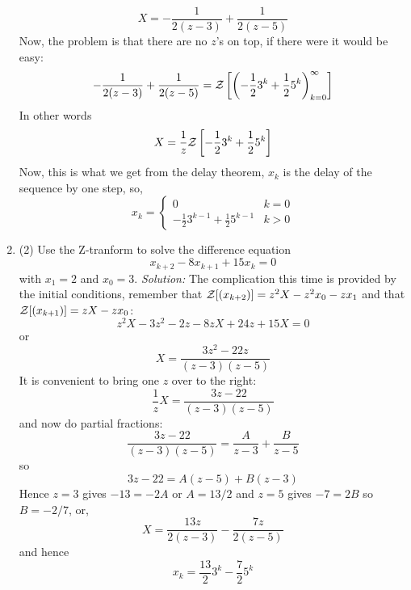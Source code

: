 \documentclass[12pt]{article}
\newcommand\soln{\noindent\textit{Solution:} }
\begin{document}
\begin{enumerate}
\begin{equation}
X=-\frac{1}{2(z-3)}+\frac{1}{2(z-5)}
\end{equation}
Now, the problem is that there are no $z$'s on top, if there were it would be easy:
\begin{equation}
-\frac{1}{2(z-3)}+\frac{1}{2(z-5)}={\cal Z}\left[\left(-\frac{1}{2}3^k+\frac{1}{2}5^k\right)_{k=0}^\infty\right]
\end{equation}
In other words
\begin{equation}
X=\frac{1}{z}{\cal Z}\left[-\frac{1}{2}3^k+\frac{1}{2}5^k\right]
\end{equation}
Now, this is what we get from the delay theorem, $x_k$ is the delay of the sequence by one step, so,
\begin{equation}
x_k=\left\{\begin{array}{ll}0&k=0\\-\frac{1}{2}3^{k-1}+\frac{1}{2}5^{k-1}&k>0
\end{array}\right.
\end{equation}
\vskip 1cm
\item (2) Use the Z-tranform to solve the difference equation
\begin{equation}
x_{k+2}-8x_{k+1}+15x_k=0
\end{equation}
with $x_1=2$ and $x_0=3$.
\vskip 1cm
\soln The complication this time is provided by the initial conditions, remember that ${\cal Z}[(x_{k+2})]=z^2X-z^2x_0-zx_1$ and  that ${\cal Z}[(x_{k+1})]=zX-zx_0$:
\begin{equation}
z^2X-3z^2-2z-8zX+24z+15X=0
\end{equation}
or
\begin{equation}
X=\frac{3z^2-22z}{(z-3)(z-5)}
\end{equation}
It is convenient to bring one $z$ over to the right:
\begin{equation}
\frac{1}{z}X=\frac{3z-22}{(z-3)(z-5)}
\end{equation}
and now do partial fractions:
\begin{equation}
\frac{3z-22}{(z-3)(z-5)}=\frac{A}{z-3}+\frac{B}{z-5}
\end{equation}
so
\begin{equation}
3z-22=A(z-5)+B(z-3)
\end{equation}
Hence $z=3$ gives $-13=-2A$ or $A=13/2$ and $z=5$ gives $-7=2B$ so $B=-2/7$, or,
\begin{equation}
X=\frac{13z}{2(z-3)}-\frac{7z}{2(z-5)}
\end{equation}
and hence
\begin{equation}
x_k=\frac{13}{2}3^k-\frac{7}{2}5^k
\end{equation}
\end{enumerate}
\end{document}
